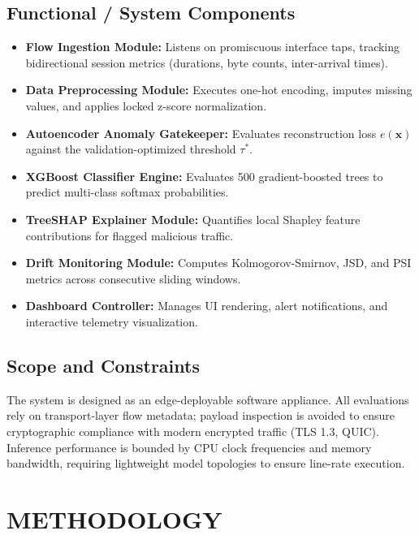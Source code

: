\documentclass[12pt,a4paper]{report}
\begin{document}
\section{Functional / System Components}
\begin{itemize}
    \item \textbf{Flow Ingestion Module:} Listens on promiscuous interface taps, tracking bidirectional session metrics (durations, byte counts, inter-arrival times).
    \item \textbf{Data Preprocessing Module:} Executes one-hot encoding, imputes missing values, and applies locked z-score normalization.
    \item \textbf{Autoencoder Anomaly Gatekeeper:} Evaluates reconstruction loss $e(\mathbf{x})$ against the validation-optimized threshold $\tau^*$.
    \item \textbf{XGBoost Classifier Engine:} Evaluates 500 gradient-boosted trees to predict multi-class softmax probabilities.
    \item \textbf{TreeSHAP Explainer Module:} Quantifies local Shapley feature contributions for flagged malicious traffic.
    \item \textbf{Drift Monitoring Module:} Computes Kolmogorov-Smirnov, JSD, and PSI metrics across consecutive sliding windows.
    \item \textbf{Dashboard Controller:} Manages UI rendering, alert notifications, and interactive telemetry visualization.
\end{itemize}

\section{Scope and Constraints}
The system is designed as an edge-deployable software appliance. All evaluations rely on transport-layer flow metadata; payload inspection is avoided to ensure cryptographic compliance with modern encrypted traffic (TLS 1.3, QUIC). Inference performance is bounded by CPU clock frequencies and memory bandwidth, requiring lightweight model topologies to ensure line-rate execution.

\clearpage
\chapter{METHODOLOGY}\label{ch:methodology}
\end{document}
